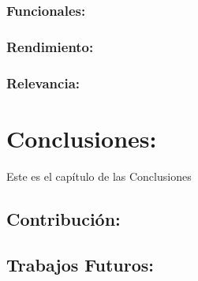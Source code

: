 \documentclass[
  10,
  openany]{book}
\begin{document}
\hypertarget{pruebas1}{%
\subsection{Funcionales:}\label{pruebas1}}

\hypertarget{pruebas2}{%
\subsection{Rendimiento:}\label{pruebas2}}

\hypertarget{pruebas3}{%
\subsection{Relevancia:}\label{pruebas3}}

\hypertarget{conclusiones}{%
\chapter{Conclusiones:}\label{conclusiones}}

Este es el capítulo de las Conclusiones

\hypertarget{conclusionescontri}{%
\section{Contribución:}\label{conclusionescontri}}

\hypertarget{conclusionestrabafutu}{%
\section{Trabajos Futuros:}\label{conclusionestrabafutu}}

  
\end{document}
